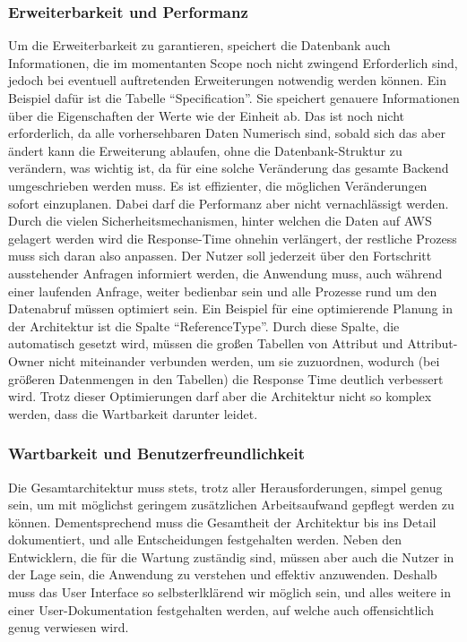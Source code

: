 \subsubsection{Erweiterbarkeit und Performanz}
Um die Erweiterbarkeit zu garantieren, speichert die Datenbank auch Informationen, die im momentanten Scope noch nicht zwingend Erforderlich sind,
jedoch bei eventuell auftretenden Erweiterungen notwendig werden können. Ein Beispiel dafür ist die Tabelle \enquote{Specification}. Sie speichert genauere Informationen
über die Eigenschaften der Werte wie der Einheit ab. Das ist noch nicht erforderlich, da alle vorhersehbaren Daten Numerisch sind, sobald sich das aber ändert kann 
die Erweiterung ablaufen, ohne die Datenbank-Struktur zu verändern, was wichtig ist, da für eine solche Veränderung das gesamte Backend umgeschrieben werden muss. Es ist 
effizienter, die möglichen Veränderungen sofort einzuplanen. Dabei darf die Performanz aber nicht vernachlässigt werden. Durch die vielen Sicherheitsmechanismen, hinter welchen
die Daten auf AWS gelagert werden wird die Response-Time ohnehin verlängert, der restliche Prozess muss sich daran also anpassen. Der Nutzer soll jederzeit über den Fortschritt
ausstehender Anfragen informiert werden, die Anwendung muss, auch während einer laufenden Anfrage, weiter bedienbar sein und alle Prozesse rund um den Datenabruf müssen 
optimiert sein. Ein Beispiel für eine optimierende Planung in der Architektur ist die Spalte \enquote{ReferenceType}. Durch diese Spalte, die automatisch gesetzt wird, müssen die großen
Tabellen von Attribut und Attribut-Owner nicht miteinander verbunden werden, um sie zuzuordnen, wodurch (bei größeren Datenmengen in den Tabellen) die Response Time deutlich verbessert wird.
Trotz dieser Optimierungen darf aber die Architektur nicht so komplex werden, dass die Wartbarkeit darunter leidet.
\subsubsection{Wartbarkeit und Benutzerfreundlichkeit}
Die Gesamtarchitektur muss stets, trotz aller Herausforderungen, simpel genug sein, um mit möglichst geringem zusätzlichen Arbeitsaufwand gepflegt werden zu können.
Dementsprechend muss die Gesamtheit der Architektur bis ins Detail dokumentiert, und alle Entscheidungen festgehalten werden. Neben den Entwicklern, die für die Wartung zuständig sind, 
müssen aber auch die Nutzer in der Lage sein, die Anwendung zu verstehen und effektiv anzuwenden. Deshalb muss das User Interface so selbsterlklärend wir möglich sein, und alles weitere 
in einer User-Dokumentation festgehalten werden, auf welche auch offensichtlich genug verwiesen wird. 
 

